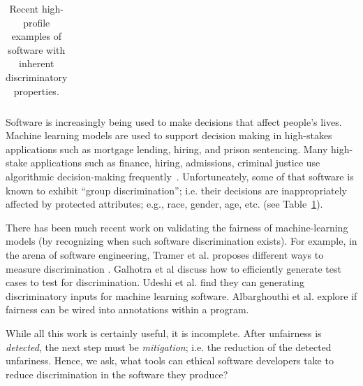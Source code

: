 \documentclass{NSF}
\newcommand{\tbl}[1]{Table~\ref{tbl:#1}}
\begin{document}
\begin{nsfdescription}
\begin{table}
\begin{tabular}{|p{3in}|}
\end{tabular} 
\caption{Recent high-profile examples of software with inherent discriminatory properties.}
\label{tbl:eg}
\end{table}
Software is increasingly being used to make decisions that affect people's lives. 
 Machine learning models are used to support decision making in high-stakes applications such as mortgage lending, hiring, and prison sentencing. 
Many high-stake applications such as finance, hiring, admissions, criminal justice use algorithmic decision-making frequently~\cite{ladd1998evidence,burrell2016machine,corbett2018measure,galindo2000credit,yan2013system,chalfin2016productivity,ajit2016prediction,berk2015machine,berk2016forecasting,ozkan2017predicting}. 
Unfortuneately, some of that software is known to  exhibit ``group discrimination''; i.e. their decisions are inappropriately affected by protected attributes; e.g., race, gender, age, etc.  (see \tbl{eg}).

There has been much recent work on validating the fairness of machine-learning models (by recognizing when such software discrimination exists). For example, in the arena of software engineering, 
Tramer et al. proposes different ways to measure discrimination \cite{Tramer_2017}.
  Galhotra et al discuss how to efficiently generate test cases to test for discrimination\cite{Galhotra_2017}.  Udeshi et al. \cite{Udeshi_2018} find they can
  generating discriminatory  inputs for machine learning software.  Albarghouthi et al. \cite{Albarghouthi:2019:FP:3287560.3287588} explore if fairness can be wired into annotations within a program.
 
 
 While all this work is certainly useful, it is incomplete. After unfairness
 is {\em detected}, the next step must be {\em mitigation}; i.e. the reduction of the
 detected unfariness.
 Hence, we ask,
 what tools can ethical software developers take to reduce discrimination in the software they produce?


\end{nsfdescription}
\end{document}
